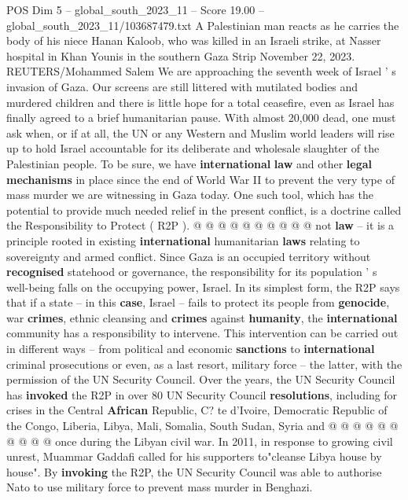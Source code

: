\begin{textsample}{POS Dim 5 – global\_south\_2023\_11 – Score 19.00 – global\_south\_2023\_11/103687479.txt}  \label{ex:f5_pos_251}
A Palestinian man reacts as he carries the body of his niece Hanan Kaloob, who was killed in an Israeli strike, at Nasser hospital in Khan Younis in the southern Gaza Strip November 22, 2023.
REUTERS/Mohammed Salem We are approaching the seventh week of Israel ' s invasion of Gaza.
Our screens are still littered with mutilated bodies and murdered children and there is little hope for a total ceasefire, even as Israel has finally agreed to a brief humanitarian pause.
With almost 20,000 dead, one must ask when, or if at all, the UN or any Western and Muslim world leaders will rise up to hold Israel accountable for its deliberate and wholesale slaughter of the Palestinian people.
To be sure, we have \textbf{international} \textbf{law} and other \textbf{legal} \textbf{mechanisms} in place since the end of World War II to prevent the very type of mass murder we are witnessing in Gaza today.
One such tool, which has the potential to provide much needed relief in the present conflict, is a doctrine called the Responsibility to Protect ( R2P ). @ @ @ @ @ @ @ @ @ @ not \textbf{law} -- it is a principle rooted in existing \textbf{international} humanitarian \textbf{laws} relating to sovereignty and armed conflict.
Since Gaza is an occupied territory without \textbf{recognised} statehood or governance, the responsibility for its population ' s well-being falls on the occupying power, Israel.
In its simplest form, the R2P says that if a state -- in this \textbf{case}, Israel -- fails to protect its people from \textbf{genocide}, war \textbf{crimes}, ethnic cleansing and \textbf{crimes} against \textbf{humanity}, the \textbf{international} community has a responsibility to intervene.
This intervention can be carried out in different ways -- from political and economic \textbf{sanctions} to \textbf{international} criminal prosecutions or even, as a last resort, military force -- the latter, with the permission of the UN Security Council.
Over the years, the UN Security Council has \textbf{invoked} the R2P in over 80 UN Security Council \textbf{resolutions}, including for crises in the Central \textbf{African} Republic, C? te d'Ivoire, Democratic Republic of the Congo, Liberia, Libya, Mali, Somalia, South Sudan, Syria and @ @ @ @ @ @ @ @ @ @ once during the Libyan civil war.
In 2011, in response to growing civil unrest, Muammar Gaddafi called for his supporters to"cleanse Libya house by house".
By \textbf{invoking} the R2P, the UN Security Council was able to authorise Nato to use military force to prevent mass murder in Benghazi.

\end{textsample}
